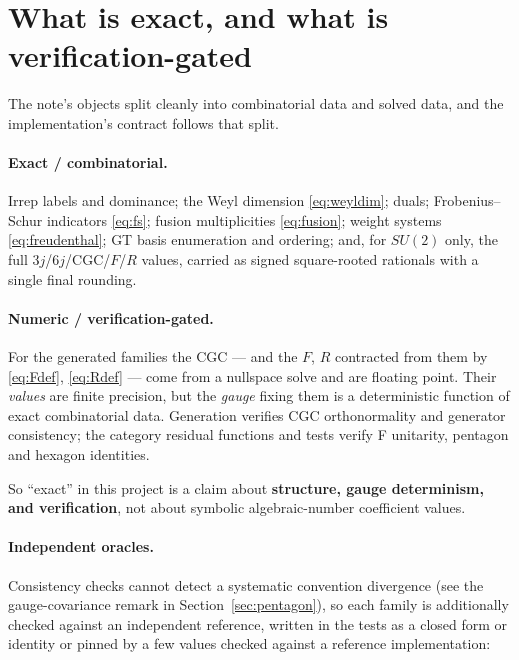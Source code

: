 \documentclass[11pt,a4paper]{article}
\theoremstyle{plain}
\theoremstyle{definition}
\begin{document}
\section{What is exact, and what is verification-gated}
\label{sec:exact}

The note's objects split cleanly into combinatorial data and solved data, and
the implementation's contract follows that split.

\paragraph{Exact / combinatorial.} Irrep labels and dominance; the Weyl
dimension \eqref{eq:weyldim}; duals; Frobenius--Schur indicators
\eqref{eq:fs}; fusion multiplicities \eqref{eq:fusion}; weight systems
\eqref{eq:freudenthal}; GT basis enumeration and ordering; and, for
$SU(2)$ only, the full $3j$/$6j$/CGC/$F$/$R$ values, carried as signed
square-rooted rationals with a single final rounding.

\paragraph{Numeric / verification-gated.} For the generated families the CGC
--- and the $F$, $R$ contracted from them by \eqref{eq:Fdef},
\eqref{eq:Rdef} --- come from a nullspace solve and are floating point. Their
\emph{values} are finite precision, but the \emph{gauge} fixing them is a
deterministic function of exact combinatorial data. Generation verifies CGC orthonormality and generator
consistency; the category residual functions and tests verify F unitarity,
pentagon and hexagon identities.

So ``exact'' in this project is a claim about \textbf{structure, gauge
determinism, and verification}, not about symbolic algebraic-number
coefficient values.

\paragraph{Independent oracles.} Consistency checks cannot detect a systematic
convention divergence (see the gauge-covariance remark in
Section~\ref{sec:pentagon}), so each family is additionally checked against an
independent reference, written in the tests as a closed form or identity or
pinned by a few values checked against a reference implementation:
\end{document}
